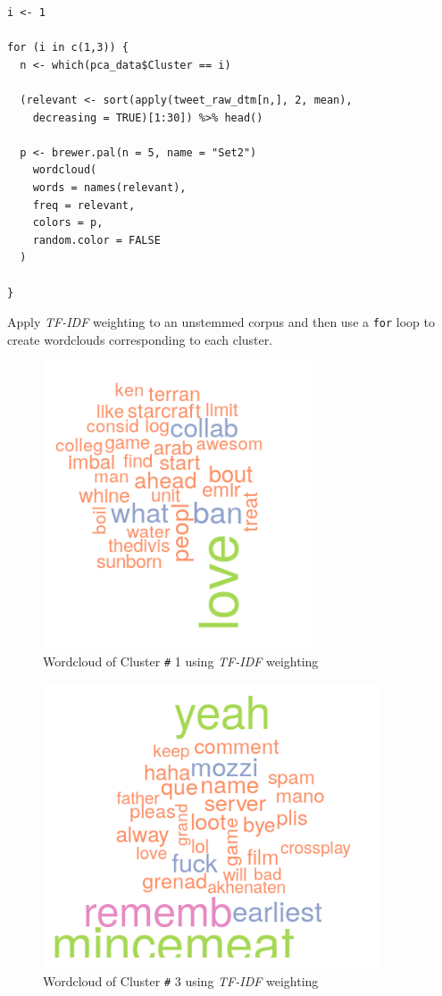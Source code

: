 \documentclass[11pt]{article}
\begin{document}
\begin{listing}[htbp]
\begin{verbatim}
i <- 1

for (i in c(1,3)) {
  n <- which(pca_data$Cluster == i)

  (relevant <- sort(apply(tweet_raw_dtm[n,], 2, mean),
    decreasing = TRUE)[1:30]) %>% head()

  p <- brewer.pal(n = 5, name = "Set2")
    wordcloud(
    words = names(relevant),
    freq = relevant,
    colors = p,
    random.color = FALSE
  )

}
\end{verbatim}
\caption{\label{org82b7a0b}Apply \emph{TF-IDF} weighting to an unstemmed corpus and then use a \texttt{for} loop to create wordclouds corresponding to each cluster.}
\end{listing}

\begin{figure}[htbp]
\centering
\includegraphics[width=8cm]{./Figures/Cluster1Cloud.png}
\caption{\label{fig:orgc5589c7}Wordcloud of Cluster \texttt{\#} 1 using \emph{TF-IDF} weighting}
\end{figure}

\begin{figure}[htbp]
\centering
\includegraphics[width=10cm]{./Figures/Cluster3Cloud.png}
\caption{\label{fig:org9874b2c}Wordcloud of Cluster \texttt{\#} 3 using \emph{TF-IDF} weighting}
\end{figure}
\end{document}
